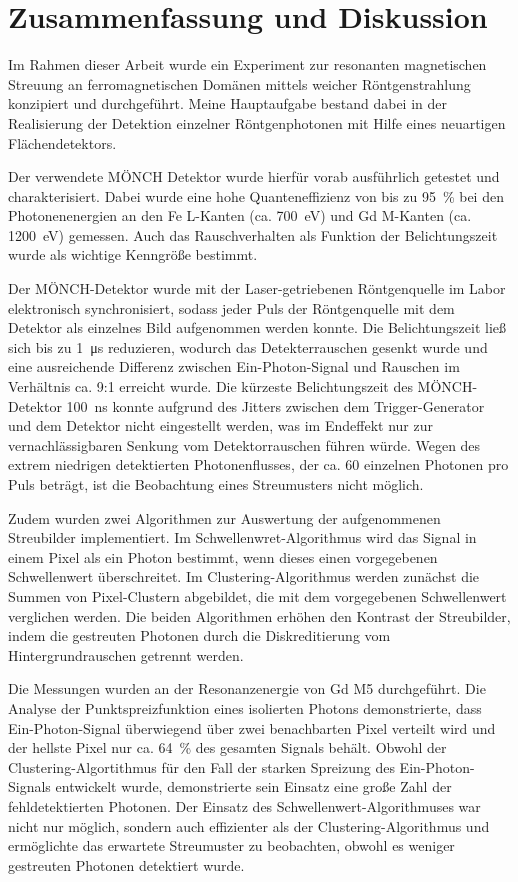 \chapter{Zusammenfassung und Diskussion}
Im Rahmen dieser Arbeit wurde ein Experiment zur resonanten magnetischen Streuung an ferromagnetischen Domänen mittels weicher Röntgenstrahlung konzipiert und durchgeführt. Meine Hauptaufgabe bestand dabei in der Realisierung der Detektion einzelner Röntgenphotonen mit Hilfe eines neuartigen Flächendetektors.

\noindent
Der verwendete MÖNCH Detektor wurde hierfür vorab ausführlich getestet und charakterisiert. Dabei wurde eine hohe Quanteneffizienz von bis zu \SI{95}{\percent} bei den Photonenenergien an den Fe L-Kanten (ca. \SI{700}{\eV}) und Gd M-Kanten (ca. \SI{1200}{\eV}) gemessen. Auch das Rauschverhalten als Funktion der Belichtungszeit wurde als wichtige Kenngröße bestimmt.

\noindent
Der MÖNCH-Detektor wurde mit der Laser-getriebenen Röntgenquelle im Labor elektronisch synchronisiert, sodass jeder Puls der Röntgenquelle mit dem Detektor als einzelnes Bild aufgenommen werden konnte. Die Belichtungszeit ließ sich bis zu \SI{1}{\micro\second} reduzieren, wodurch das Detekterrauschen gesenkt wurde und eine ausreichende Differenz zwischen Ein-Photon-Signal und Rauschen im Verhältnis ca. 9:1 erreicht wurde. Die kürzeste Belichtungszeit des MÖNCH-Detektor \SI{100}{\nano\second} konnte aufgrund des Jitters zwischen dem Trigger-Generator und dem Detektor nicht eingestellt werden, was im Endeffekt nur zur vernachlässigbaren Senkung vom Detektorrauschen führen würde. Wegen des extrem niedrigen detektierten Photonenflusses, der ca. 60 einzelnen Photonen pro Puls beträgt, ist die Beobachtung eines Streumusters nicht möglich.

\noindent
Zudem wurden zwei Algorithmen zur Auswertung der aufgenommenen Streubilder implementiert. Im Schwellenwret-Algorithmus wird das Signal in einem Pixel als ein Photon bestimmt, wenn dieses einen vorgegebenen Schwellenwert überschreitet. Im Clustering-Algorithmus werden zunächst die Summen von Pixel-Clustern abgebildet, die mit dem vorgegebenen Schwellenwert verglichen werden. Die beiden Algorithmen erhöhen den Kontrast der Streubilder, indem die gestreuten Photonen durch die Diskreditierung vom Hintergrundrauschen getrennt werden.

\noindent
Die Messungen wurden an der Resonanzenergie von Gd M5 durchgeführt. Die Analyse der Punktspreizfunktion eines isolierten Photons demonstrierte, dass Ein-Photon-Signal überwiegend über zwei benachbarten Pixel verteilt wird und der hellste Pixel nur ca. \SI{64}{\percent} des gesamten Signals behält. Obwohl der Clustering-Algortithmus für den Fall der starken Spreizung des Ein-Photon-Signals entwickelt wurde, demonstrierte sein Einsatz eine große Zahl der fehldetektierten Photonen. Der Einsatz des Schwellenwert-Algorithmuses war nicht nur möglich, sondern auch effizienter als der Clustering-Algorithmus und ermöglichte das erwartete Streumuster zu beobachten, obwohl es weniger gestreuten Photonen detektiert wurde.  

